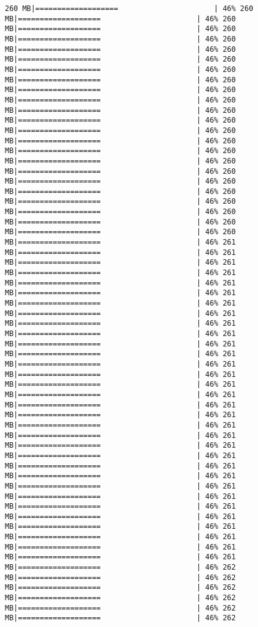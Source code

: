 \documentclass[
]{article}
\begin{document}
\begin{verbatim}
260 MB|===================                      | 46% 260 MB|===================                      | 46% 260 MB|===================                      | 46% 260 MB|===================                      | 46% 260 MB|===================                      | 46% 260 MB|===================                      | 46% 260 MB|===================                      | 46% 260 MB|===================                      | 46% 260 MB|===================                      | 46% 260 MB|===================                      | 46% 260 MB|===================                      | 46% 260 MB|===================                      | 46% 260 MB|===================                      | 46% 260 MB|===================                      | 46% 260 MB|===================                      | 46% 260 MB|===================                      | 46% 260 MB|===================                      | 46% 260 MB|===================                      | 46% 260 MB|===================                      | 46% 260 MB|===================                      | 46% 260 MB|===================                      | 46% 260 MB|===================                      | 46% 260 MB|===================                      | 46% 260 MB|===================                      | 46% 261 MB|===================                      | 46% 261 MB|===================                      | 46% 261 MB|===================                      | 46% 261 MB|===================                      | 46% 261 MB|===================                      | 46% 261 MB|===================                      | 46% 261 MB|===================                      | 46% 261 MB|===================                      | 46% 261 MB|===================                      | 46% 261 MB|===================                      | 46% 261 MB|===================                      | 46% 261 MB|===================                      | 46% 261 MB|===================                      | 46% 261 MB|===================                      | 46% 261 MB|===================                      | 46% 261 MB|===================                      | 46% 261 MB|===================                      | 46% 261 MB|===================                      | 46% 261 MB|===================                      | 46% 261 MB|===================                      | 46% 261 MB|===================                      | 46% 261 MB|===================                      | 46% 261 MB|===================                      | 46% 261 MB|===================                      | 46% 261 MB|===================                      | 46% 261 MB|===================                      | 46% 261 MB|===================                      | 46% 261 MB|===================                      | 46% 261 MB|===================                      | 46% 261 MB|===================                      | 46% 261 MB|===================                      | 46% 261 MB|===================                      | 46% 262 MB|===================                      | 46% 262 MB|===================                      | 46% 262 MB|===================                      | 46% 262 MB|===================                      | 46% 262 MB|===================                      | 46% 262 
\end{verbatim}
\end{document}
